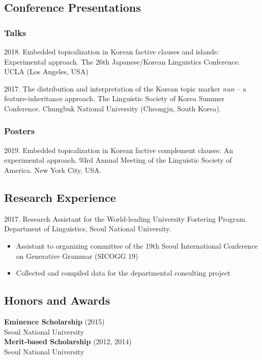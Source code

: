 \documentclass[12pt]{article}
\begin{document}
{\null}
\subsection*{Conference Presentations}
\subsubsection*{Talks}
{2018. Embedded topicalization in Korean factive clauses and islands: Experimental approach. The 26th Japanese/Korean Linguistics Conference. UCLA (Los Angeles, USA)}\\

{2017. The distribution and interpretation of the Korean topic marker \textit{nun} -- a feature-inheritance approach. The Linguistic Society of Korea Summer Conference. Chungbuk National University (Cheongju, South Korea).

\subsubsection*{Posters}
{2019. Embedded topicalization in Korean factive complement clauses: An experimental approach. 93rd Annual Meeting of the Linguistic Society of America. New York City, USA.}

{\null}
\subsection*{Research Experience}
{2017. Research Assistant for the World-leading University Fostering Program.\\
Department of Linguistics, Seoul National University.
\begin{itemize}
	\item{{\small Assistant to organizing committee of the 19th Seoul International Conference on Generative Grammar (SICOGG 19)}}
	\item{{\small Collected and compiled data for the departmental consulting project}}
\end{itemize}
}

{\null}
\subsection*{Honors and Awards}
{\textbf{Eminence Scholarship}} (2015)\\{Seoul National University}\\

{\textbf{Merit-based Scholarship}} (2012, 2014)\\{Seoul National University}\\

}
\end{document}
